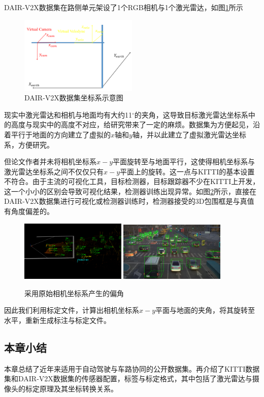 DAIR-V2X数据集在路侧单元架设了1个RGB相机与1个激光雷达，如图\ref{fig6}所示

\begin{figure}[htb] 
    \center
    \includegraphics[width=0.5\textwidth]{figure/fig6.png}
    \caption{DAIR-V2X数据集坐标系示意图}
    \label{fig6}
\end{figure}

现实中激光雷达和相机与地面均有大约11$^\circ$的夹角，这导致目标激光雷达坐标系中的高度与现实中的高度不对应，给研究带来了一定的麻烦。数据集为方便起见，沿着平行于地面的方向建立了虚拟的$x$轴和$y$轴，并以此建立了虚拟激光雷达坐标系，方便研究。

但论文作者并未将相机坐标系$x-y$平面旋转至与地面平行，这使得相机坐标系与激光雷达坐标系之间不仅仅只有$x-y$平面上的旋转。这一点与KITTI的基本设置不符合。由于主流的可视化工具，目标检测器，目标跟踪器不少在KITTI上开发，这一个小小的区别会导致可视化结果，检测器训练出现异常。如图\ref{fig7}所示，直接在DAIR-V2X数据集进行可视化或检测器训练时，检测器接受的3D包围框是与真值有角度偏差的。

\begin{figure}[htb] 
    \center
    \includegraphics[width=0.45\textwidth]{figure/fig10.png}
    \includegraphics[width=0.45\textwidth]{figure/fig11.png}
    \caption{采用原始相机坐标系产生的偏角}
    \label{fig7}
\end{figure}

因此我们利用标定文件，计算出相机坐标系$x-y$平面与地面的夹角，将其旋转至水平，重新生成标注与标定文件。

\subsection{本章小结}

本章总结了近年来适用于自动驾驶与车路协同的公开数据集。再介绍了KITTI数据集和DAIR-V2X数据集的传感器配置，标签与标定格式，其中包括了激光雷达与摄像头的标定原理及其坐标转换关系。